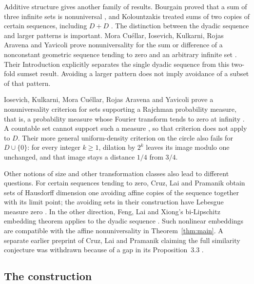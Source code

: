Additive structure gives another family of results. Bourgain proved
that a sum of three infinite sets is nonuniversal
\cite{Bourgain1987}, and Kolountzakis treated sums of two copies of
certain sequences, including $D+D$ \cite[Section~3.4]{Kolountzakis1997}.
The distinction between the dyadic sequence and larger patterns is
important. Mora Cu\'ellar, Iosevich, Kulkarni, Rojas Aravena and Yavicoli
prove nonuniversality for the sum or difference of a nonconstant geometric
sequence tending to zero and an arbitrary infinite set
\cite[Theorem~2]{MoraCuellarEtAl2026Twofold}. Their Introduction explicitly
separates the single dyadic sequence from this two-fold sumset result.
Avoiding a larger pattern does not imply avoidance of a subset of that
pattern.

Iosevich, Kulkarni, Mora Cu\'ellar, Rojas Aravena and Yavicoli prove a
nonuniversality criterion for sets supporting a Rajchman probability
measure, that is, a probability measure whose Fourier transform tends to
zero at infinity \cite[Theorem~1.5]{IKMRY2026Rajchman}. A countable set
cannot support such a measure \cite[Proposition~4.1]{IKMRY2026Rajchman},
so that criterion does not apply to $D$. Their more general
uniform-density criterion on the circle
\cite[Proposition~3.2]{IKMRY2026Rajchman} also fails for
$D\cup\{0\}$: for every integer $k\ge1$, dilation by $2^k$ leaves its
image modulo one unchanged,
and that image stays a distance $1/4$ from $3/4$.

Other notions of size and other transformation classes also lead to
different questions. For certain sequences tending to zero, Cruz, Lai and
Pramanik obtain sets of Hausdorff dimension one avoiding affine copies of
the sequence together with its limit point; the avoiding sets in their
construction have Lebesgue measure zero
\cite[preprint, Corollary~1.2 and Proposition~4.4]{CruzLaiPramanik2023}.
In the other direction,
Feng, Lai and Xiong's bi-Lipschitz embedding theorem applies to the dyadic
sequence \cite[preprint, Theorem~1.1]{FengLaiXiong2024}. Such nonlinear embeddings
are compatible with the affine nonuniversality in Theorem~\ref{thm:main}.
A separate earlier preprint of Cruz, Lai and Pramanik claiming the full
similarity conjecture was withdrawn because of a gap in its
Proposition~3.3 \cite{CruzLaiPramanik2020Withdrawn}.

\subsection{The construction}

